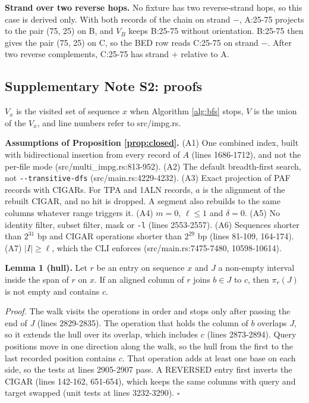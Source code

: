 \textbf{Strand over two reverse hops.}
No fixture has two reverse-strand hops, so this case is derived only.
With both records of the chain on strand $-$, A:25-75 projects to the pair (75, 25) on B, and $V_B$ keeps B:25-75 without orientation.
B:25-75 then gives the pair (75, 25) on C, so the BED row reads C:25-75 on strand $-$.
After two reverse complements, C:25-75 has strand $+$ relative to A.

\subsection*{Supplementary Note S2: proofs}

$V_x$ is the visited set of sequence $x$ when Algorithm \ref{alg:bfs} stops, $V$ is the union of the $V_x$, and line numbers refer to src/impg.rs.

\textbf{Assumptions of Proposition \ref{prop:closed}.}
(A1) One combined index, built with bidirectional insertion from every record of $A$ (lines 1686-1712), and not the per-file mode (src/multi\_impg.rs:813-952).
(A2) The default breadth-first search, not \texttt{-{}-transitive-dfs} (src/main.rs:4229-4232).
(A3) Exact projection of PAF records with CIGARs.
For TPA and 1ALN records, $a$ is the alignment of the rebuilt CIGAR, and no hit is dropped.
A segment also rebuilds to the same columns whatever range triggers it.
(A4) $m=0$, $\ell\le 1$ and $\delta=0$.
(A5) No identity filter, subset filter, mask or \texttt{-l} (lines 2553-2557).
(A6) Sequences shorter than $2^{31}$ bp and CIGAR operations shorter than $2^{29}$ bp (lines 81-109, 164-174).
(A7) $|I|\ge\ell$, which the CLI enforces (src/main.rs:7475-7480, 10598-10614).

\textbf{Lemma 1 (hull).}
Let $r$ be an entry on sequence $x$ and $J$ a non-empty interval inside the span of $r$ on $x$.
If an aligned column of $r$ joins $b\in J$ to $c$, then $\pi_r(J)$ is not empty and contains $c$.

\emph{Proof.}
The walk visits the operations in order and stops only after passing the end of $J$ (lines 2829-2835).
The operation that holds the column of $b$ overlaps $J$, so it extends the hull over its overlap, which includes $c$ (lines 2873-2894).
Query positions move in one direction along the walk, so the hull from the first to the last recorded position contains $c$.
That operation adds at least one base on each side, so the tests at lines 2905-2907 pass.
A REVERSED entry first inverts the CIGAR (lines 142-162, 651-654), which keeps the same columns with query and target swapped (unit tests at lines 3232-3290).
$\square$

